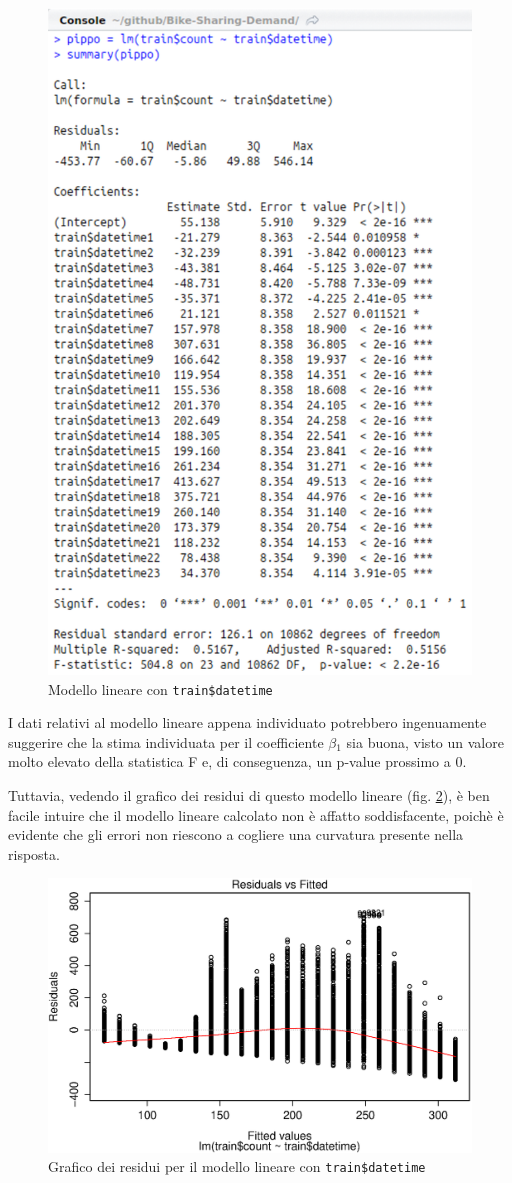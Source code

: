 \begin{figure}
  \centering
  \includegraphics[width=.5\columnwidth]{images/simplest-linear-model.eps}
  \caption{Modello lineare con \texttt{train\$datetime}}
  \label{fig:simplest-linear-model}
\end{figure}

I dati relativi al modello lineare appena individuato potrebbero ingenuamente
suggerire che la stima individuata per il coefficiente $\beta{}_1$ sia buona,
visto un valore molto elevato della statistica F e, di conseguenza, un p-value
prossimo a 0.

Tuttavia, vedendo il grafico dei residui di questo modello lineare (fig.
\ref{fig:simpl-mod-lin-residuals}), è ben facile intuire che il modello lineare
calcolato non è affatto soddisfacente, poichè è evidente che gli errori non
riescono a cogliere una curvatura presente nella risposta.

\begin{figure}
  \centering
  \includegraphics[width=.7\columnwidth]{images/simple-linear-model-plot.eps}
  \caption{Grafico dei residui per il modello lineare con
  \texttt{train\$datetime}}
  \label{fig:simpl-mod-lin-residuals}
\end{figure}


